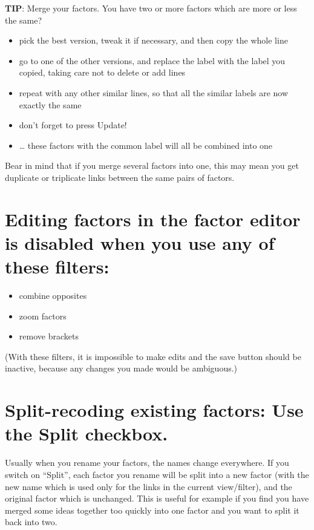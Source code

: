 \documentclass[
]{book}
\providecommand{\tightlist}{%
  \setlength{\itemsep}{0pt}\setlength{\parskip}{0pt}}
\begin{document}
\textbf{TIP}: Merge your factors. You have two or more factors which are more or less the same?

\begin{itemize}
\tightlist
\item
  pick the best version, tweak it if necessary, and then copy the whole line
\item
  go to one of the other versions, and replace the label with the label you copied, taking care not to delete or add lines
\item
  repeat with any other similar lines, so that all the similar labels are now exactly the same
\item
  don't forget to press Update!
\item
  \ldots{} these factors with the common label will all be combined into one
\end{itemize}

Bear in mind that if you merge several factors into one, this may mean you get duplicate or triplicate links between the same pairs of factors.

\hypertarget{editing-factors-in-the-factor-editor-is-disabled-when-you-use-any-of-these-filters}{%
\section{Editing factors in the factor editor is disabled when you use any of these filters:}\label{editing-factors-in-the-factor-editor-is-disabled-when-you-use-any-of-these-filters}}

\begin{itemize}
\tightlist
\item
  combine opposites
\item
  zoom factors
\item
  remove brackets
\end{itemize}

(With these filters, it is impossible to make edits and the save button should be inactive, because any changes you made would be ambiguous.)

\hypertarget{split-recoding}{%
\section{\texorpdfstring{Split-recoding existing factors: Use the \textbf{Split} checkbox.}{Split-recoding existing factors: Use the Split checkbox.}}\label{split-recoding}}

Usually when you rename your factors, the names change everywhere. If you switch on ``Split'', each factor you rename will be split into a new factor (with the new name which is used only for the links in the current view/filter), and the original factor which is unchanged. This is useful for example if you find you have merged some ideas together too quickly into one factor and you want to split it back into two.
\end{document}
